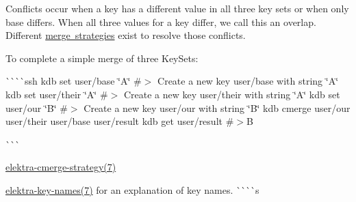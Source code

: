 Conflicts occur when a key has a different value in all three key sets or when only base differs. When all three values for a key differ, we call this an overlap. Different \mbox{\hyperlink{doc_help_elektra-cmerge-strategy_md}{merge strategies}} exist to resolve those conflicts.~\newline


To complete a simple merge of three Key\+Sets\+:~\newline


\`{}\`{}\`{}\`{}ssh kdb set user/base \char`\"{}\+A\char`\"{} \#$>$ Create a new key user/base with string \char`\"{}\+A\char`\"{} kdb set user/their \char`\"{}\+A\char`\"{} \#$>$ Create a new key user/their with string \char`\"{}\+A\char`\"{} kdb set user/our \char`\"{}\+B\char`\"{} \#$>$ Create a new key user/our with string \char`\"{}\+B\char`\"{} kdb cmerge user/our user/their user/base user/result kdb get user/result \#$>$B

\`{}\`{}\`{}~\newline



\begin{DoxyItemize}
\item \mbox{\hyperlink{doc_help_elektra-cmerge-strategy_md}{elektra-\/cmerge-\/strategy(7)}}
\item \mbox{\hyperlink{doc_help_elektra-key-names_md}{elektra-\/key-\/names(7)}} for an explanation of key names. \`{}\`{}\`{}\`{}s 
\end{DoxyItemize}
